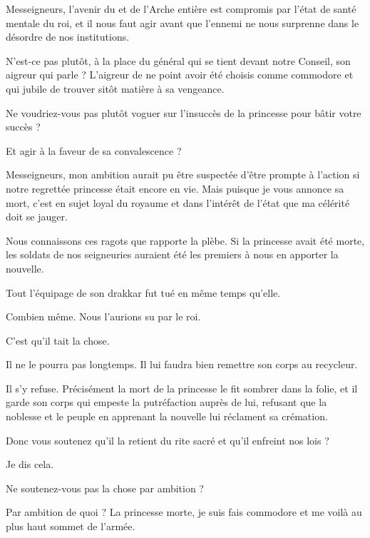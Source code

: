 \begin{drama}
  \generalspeaks Messeigneurs, l’avenir du \campprincipal{} et de l’Arche entière est compromis par l’état de santé mentale du roi,  et il nous faut agir avant que l’ennemi ne nous surprenne dans le désordre de nos institutions.

  \nobleOnespeaks N’est-ce pas plutôt, à la place du  général qui se tient devant notre Conseil, son aigreur qui parle ? L’aigreur de ne point avoir été choisis comme commodore et qui jubile de trouver sitôt matière à sa vengeance.

  \nobleTwospeaks Ne voudriez-vous pas plutôt voguer sur l’insuccès de la princesse pour bâtir votre succès ?

  \nobleTreespeaks Et agir à la faveur de sa convalescence ?

  \generalspeaks Messeigneurs, mon  ambition aurait pu être suspectée  d’être prompte à l’action si notre regrettée princesse était encore en vie. Mais puisque je vous annonce sa mort, c’est en sujet loyal du royaume et dans l’intérêt de l’état que ma célérité doit se jauger.

  \nobleOnespeaks Nous connaissons ces ragots que rapporte la plèbe. Si la princesse avait été morte, les soldats de nos seigneuries auraient été les premiers à nous en apporter la nouvelle.

  \generalspeaks Tout l’équipage de son drakkar fut tué en même temps qu’elle.

  \nobleTwospeaks Combien même. Nous l’aurions su par le roi.

  \generalspeaks C’est qu’il tait la chose.

  \nobleTreespeaks Il ne le pourra pas longtemps. Il lui faudra bien remettre son corps au recycleur.

  \generalspeaks Il s’y refuse. Précisément la mort de la princesse le fit sombrer dans la folie, et il garde son corps qui empeste la putréfaction auprès de lui, refusant que la noblesse et le peuple en apprenant la nouvelle lui réclament sa crémation.

  \nobleTreespeaks Donc vous soutenez qu’il la retient du rite sacré et qu’il enfreint nos lois ?

  \generalspeaks Je dis cela.

  \nobleTwospeaks Ne soutenez-vous pas la chose par ambition ?

  \generalspeaks Par ambition de quoi ? La princesse morte, je suis fais commodore et me voilà au plus haut sommet de l’armée.


\end{drama}
